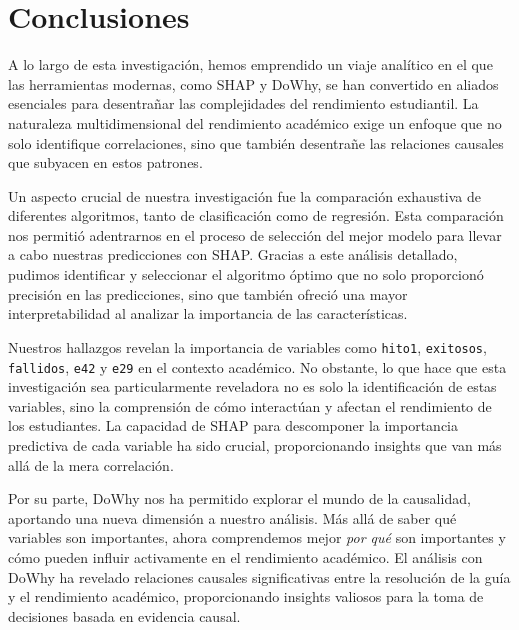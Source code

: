 \hypertarget{Conclusiones}{%
    \section{Conclusiones}\label{Conclusiones}}

A lo largo de esta investigación, hemos emprendido un viaje analítico en el que las herramientas modernas, como SHAP y DoWhy, se han convertido en aliados esenciales para desentrañar las complejidades del rendimiento estudiantil. La naturaleza multidimensional del rendimiento académico exige un enfoque que no solo identifique correlaciones, sino que también desentrañe las relaciones causales que subyacen en estos patrones.

Un aspecto crucial de nuestra investigación fue la comparación exhaustiva de diferentes algoritmos, tanto de clasificación como de regresión. Esta comparación nos permitió adentrarnos en el proceso de selección del mejor modelo para llevar a cabo nuestras predicciones con SHAP. Gracias a este análisis detallado, pudimos identificar y seleccionar el algoritmo óptimo que no solo proporcionó precisión en las predicciones, sino que también ofreció una mayor interpretabilidad al analizar la importancia de las características.

Nuestros hallazgos revelan la importancia de variables como \texttt{hito1}, \texttt{exitosos}, \texttt{fallidos}, \texttt{e42} y \texttt{e29} en el contexto académico. No obstante, lo que hace que esta investigación sea particularmente reveladora no es solo la identificación de estas variables, sino la comprensión de cómo interactúan y afectan el rendimiento de los estudiantes. La capacidad de SHAP para descomponer la importancia predictiva de cada variable ha sido crucial, proporcionando insights que van más allá de la mera correlación.

Por su parte, DoWhy nos ha permitido explorar el mundo de la causalidad, aportando una nueva dimensión a nuestro análisis. Más allá de saber qué variables son importantes, ahora comprendemos mejor \textit{por qué} son importantes y cómo pueden influir activamente en el rendimiento académico. El análisis con DoWhy ha revelado relaciones causales significativas entre la resolución de la guía y el rendimiento académico, proporcionando insights valiosos para la toma de decisiones basada en evidencia causal.

